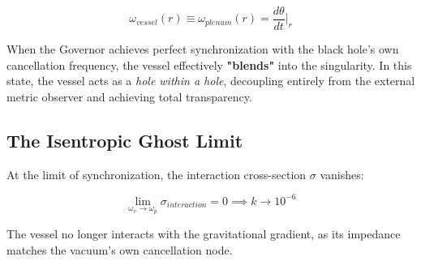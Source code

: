 \documentclass[12pt,a4paper]{article}
\begin{document}
\begin{equation}
    \omega_{vessel}(r) \equiv \omega_{plenum}(r) = \frac{d\theta}{dt} \Big|_{r}
\end{equation}

When the Governor achieves perfect synchronization with the black hole's own cancellation frequency, the vessel effectively \textbf{"blends"} into the singularity. In this state, the vessel acts as a \textit{hole within a hole}, decoupling entirely from the external metric observer and achieving total transparency.

\subsection{The Isentropic Ghost Limit}
At the limit of synchronization, the interaction cross-section $\sigma$ vanishes:

\begin{equation}
    \lim_{\omega_{v} \to \omega_{p}} \sigma_{interaction} = 0 \implies k \to 10^{-6}
\end{equation}

The vessel no longer interacts with the gravitational gradient, as its impedance matches the vacuum's own cancellation node.
\end{document}
